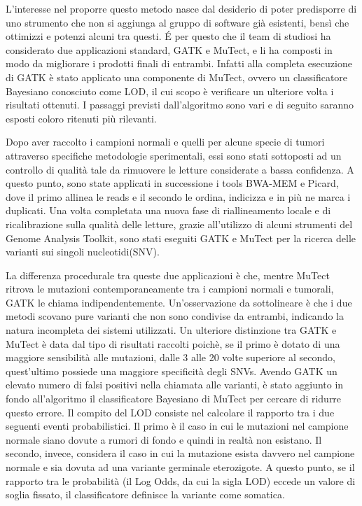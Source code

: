 L'interesse nel proporre questo metodo nasce dal desiderio di poter predisporre di uno strumento che non si aggiunga al gruppo di software già esistenti, bensì che ottimizzi e potenzi alcuni tra questi.
\'E per questo che il team di studiosi ha considerato due applicazioni standard, GATK e MuTect, e li ha composti in modo da migliorare i prodotti finali di entrambi.
Infatti alla completa esecuzione di GATK è stato applicato una componente di MuTect, ovvero un classificatore Bayesiano conosciuto come LOD, il cui scopo è verificare un ulteriore volta i risultati ottenuti.
I passaggi previsti dall'algoritmo sono vari e di seguito saranno esposti coloro ritenuti più rilevanti.

Dopo aver raccolto i campioni normali e quelli per alcune specie di tumori attraverso specifiche metodologie sperimentali, essi sono stati sottoposti ad un controllo di qualità tale da rimuovere le letture considerate a bassa confidenza.
A questo punto, sono state applicati in successione i tools BWA-MEM e Picard, dove il primo allinea le reads e il secondo le ordina, indicizza e in più ne marca i duplicati.
Una volta completata una nuova fase di riallineamento locale e di ricalibrazione sulla qualità delle letture, grazie all'utilizzo di alcuni strumenti del Genome Analysis Toolkit, sono stati eseguiti GATK e MuTect per la ricerca delle varianti sui singoli nucleotidi(SNV).

La differenza procedurale tra queste due applicazioni è che, mentre MuTect ritrova le mutazioni contemporaneamente tra i campioni normali e tumorali, GATK le chiama indipendentemente.
Un'osservazione da sottolineare è che i due metodi scovano pure varianti che non sono condivise da entrambi, indicando la natura incompleta dei sistemi utilizzati.
Un ulteriore distinzione tra GATK e MuTect è data dal tipo di risultati raccolti poichè, se il primo è dotato di una maggiore sensibilità alle mutazioni, dalle 3 alle 20 volte superiore al secondo, quest'ultimo possiede una maggiore specificità degli SNVs.
Avendo GATK un elevato numero di falsi positivi nella chiamata alle varianti, è stato aggiunto in fondo all'algoritmo il classificatore Bayesiano di MuTect per cercare di ridurre questo errore.
Il compito del LOD consiste nel calcolare il rapporto tra i due seguenti eventi probabilistici.
Il primo è il caso in cui le mutazioni nel campione normale siano dovute a rumori di fondo e quindi in realtà non esistano.
Il secondo, invece, considera il caso in cui la mutazione esista davvero nel campione normale e sia dovuta ad una variante germinale eterozigote.
A questo punto, se il rapporto tra le probabilità (il Log Odds, da cui la sigla LOD) eccede un valore di soglia fissato, il classificatore definisce la variante come somatica.

